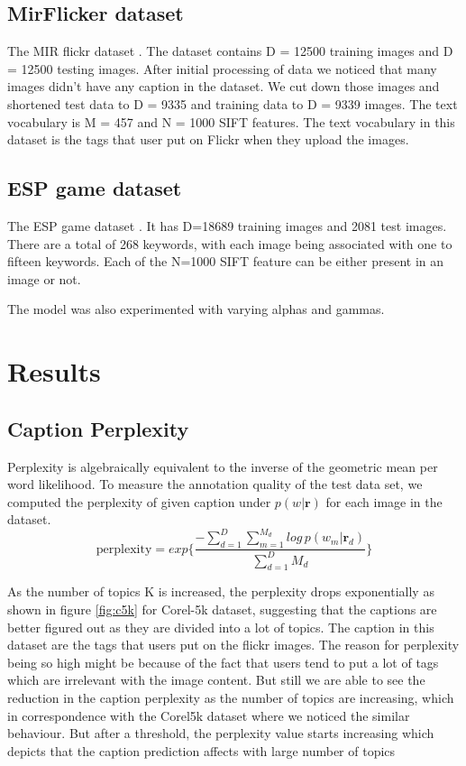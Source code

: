 \documentclass[journal]{IEEEtran}
\begin{document}
\subsection{MirFlicker dataset}

The MIR flickr dataset \cite{mirflickr}. The dataset contains D = 12500 training images and D = 12500 testing images. After initial processing of data we noticed that many images didn’t have any caption in the dataset.
We cut down those images and shortened test data to D = 9335 and training data to D = 9339 images.
The text vocabulary is M = 457 and N = 1000 SIFT features. The text vocabulary in this dataset is the tags that user put on Flickr when they upload the images.

\subsection{ESP game dataset}
The ESP game dataset \cite{espgame}. It has D=18689 training images and 2081 test images. There are a total of 268 keywords, with each image being associated with one to fifteen keywords. Each of the N=1000 SIFT feature can be either present in an image or not.


The model was also experimented with varying alphas and gammas.


\section{Results}
\subsection{Caption Perplexity}

Perplexity is algebraically equivalent to the inverse of the geometric mean per word likelihood. To measure the annotation quality of the test data set, we computed the perplexity of given caption under $p(w|\mathbf{r})$ for each image in the dataset.
\begin{equation}
    \text{perplexity} = exp \Big\{ \frac{-\sum_{d=1}^{D} \sum_{m=1}^{M_d} log\, p (w_m|\mathbf{r}_d)}{\sum_{d=1}^D M_d}\Big\}
\end{equation}


As the number of topics K is increased, the perplexity drops exponentially as shown in figure \ref{fig:c5k} for Corel-5k dataset, suggesting that the captions are better figured out as they are divided into a lot of topics.
The caption in this dataset are the tags that users put on the flickr images. The reason for perplexity being so high might be because of the fact that users tend to put a lot of tags which are irrelevant with the image content. But still we are able to see the reduction in the caption perplexity as the number of topics are increasing, which in correspondence with the Corel5k dataset where we noticed the similar behaviour.
But after a threshold, the perplexity value starts increasing which depicts that the caption prediction affects with large number of topics 
\end{document}
